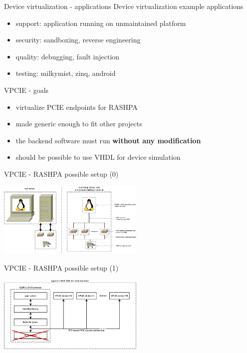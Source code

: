 \documentclass{beamer}
\begin{document}
\begin{frame}{Device virtualization - applications}
  Device virtualization example applications
  \begin{itemize}
  \item support: application running on unmaintained platform
  \item security: sandboxing, reverse engineering
  \item quality: debugging, fault injection
  \item testing: milkymist, zinq, android
  \end{itemize}
\end{frame}

\begin{frame}{VPCIE - goals}
  \begin{itemize}
  \item virtualize PCIE endpoints for RASHPA
  \item made generic enough to fit other projects
  \item the backend software must run \textbf{without any modification}
  \item should be possible to use VHDL for device simulation
  \end{itemize}
\end{frame}

\begin{frame}{VPCIE - RASHPA possible setup (0)}
  \begin{center}
  \includegraphics[width=70mm]{pic/dv_vpcie/main.jpeg}
  \end{center}
\end{frame}

\begin{frame}{VPCIE - RASHPA possible setup (1)}
  \begin{center}
  \includegraphics[width=70mm]{pic/dv_rashpa/main.jpeg}
  \end{center}
\end{frame}
\end{document}

